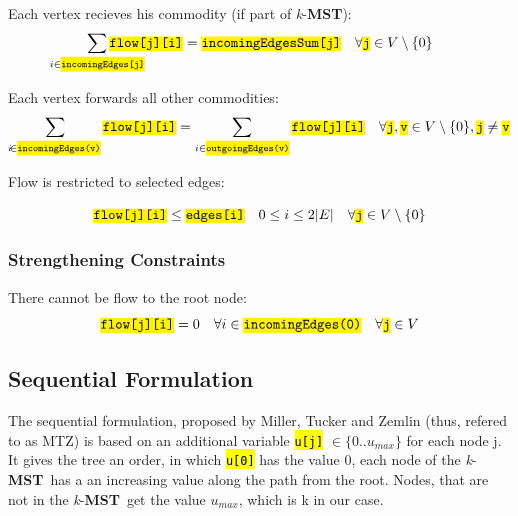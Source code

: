 \documentclass[,%
			paper=a4,%
			DIV14,
			liststotoc,
			bibtotoc,
			draft=false,%
			numbers=noendperiod
			]{scrartcl}
\newcommand{\mst}{\textbf{MST}}
\newcommand{\kmst}{\textit{k}-\mst}
\newcommand{\ilc}[1]{\hl{\texttt{#1}}} %
\newcommand{\commodity}{j}
\newcommand{\vertex}{j}
\newcommand{\edge}{i}
\newcommand{\forallEdges}{\ensuremath{0 \leq \edge \leq 2|E|}}
\begin{document}
Each vertex recieves his commodity (if part of \kmst):
\begin{equation}\label{eq:mfcRec}
	\sum_{\mathclap{\edge \in \ilc{incomingEdges[j]}}} \ilc{flow[\commodity][\edge]} 
 = \ilc{incomingEdgesSum[\commodity]}
\quad \forall \ilc{\commodity} \in V  \setminus \{0\}
\end{equation}

Each vertex forwards all other commodities:
\begin{equation}\label{eq:mfcForward}
\begin{split}
\sum_{\mathclap i \in \ilc{incomingEdges(v)}} \ilc{flow[\commodity][i]} = \sum_{ i \in \ilc{outgoingEdges(v)}} \ilc{flow[\commodity][i]} 
\quad \forall \ilc{\commodity}, \ilc{v} \in V  \setminus \{0\}
, \ilc{\commodity} \neq \ilc{v}
\end{split}
\end{equation}

Flow is restricted to selected edges:

\begin{equation}\label{eq:mfcFlowEdge}
 \ilc{flow[\commodity][\edge]} \leq \ilc{edges[\edge]}
 \quad \forallEdges 
\quad \forall \ilc{\commodity} \in V  \setminus \{0\}
\end{equation}

\subsubsection{Strengthening Constraints}

There cannot be flow to the root node:
\begin{equation}\label{eq:mfcNoFlow}
 \ilc{flow[\commodity][i]} = 0
\quad \forall i \in \ilc{incomingEdges(0)}  
\quad \forall \ilc{\commodity} \in V
\end{equation}


\subsection{Sequential Formulation}
The sequential formulation, proposed by Miller, Tucker and Zemlin (thus, refered to as MTZ) is  based on an additional variable \ilc{u[\vertex]} $\in \{0..u_{max}\}$ for each node \vertex. It gives the tree an order, in which \ilc{u[0]} has the value 0, each node of the \kmst\ has a an increasing value along the path from the root. Nodes, that are not in the \kmst\ get the value $u_{max}$, which is k in our case.
\end{document}
